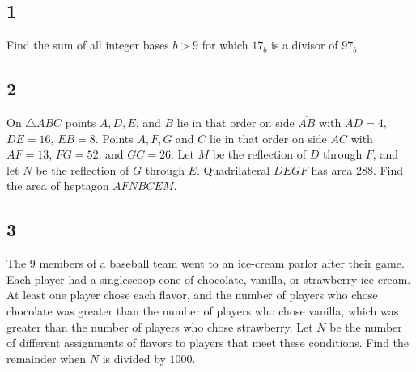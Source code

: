 \subsection{1}
Find the sum of all integer bases $b>9$ for which $17_b$ is a divisor of $97_b.$

\subsection{2}
On $\triangle ABC$ points $A, D, E$, and $B$ lie in that order on side $\overline{AB}$ with $AD = 4$, $DE = 16$, $EB = 8$. Points $A, F, G$ and $C$ lie in that order on side $\overline{AC}$ with $AF = 13$, $FG = 52$, and $GC = 26$. Let $M$ be the reflection of $D$ through $F$, and let $N$ be the reflection of $G$ through $E$. Quadrilateral $DEGF$ has area $288$. Find the area of heptagon $AFNBCEM$.



\subsection{3}
The 9 members of a baseball team went to an ice-cream parlor after their game. Each player had a singlescoop cone of chocolate, vanilla, or strawberry ice cream. At least one player chose each flavor, and the number of players who chose chocolate was greater than the number of players who chose vanilla, which was greater than the number of players who chose strawberry. Let $N$ be the number of different assignments of flavors to players that meet these conditions. Find the remainder when $N$ is divided by $1000.$

